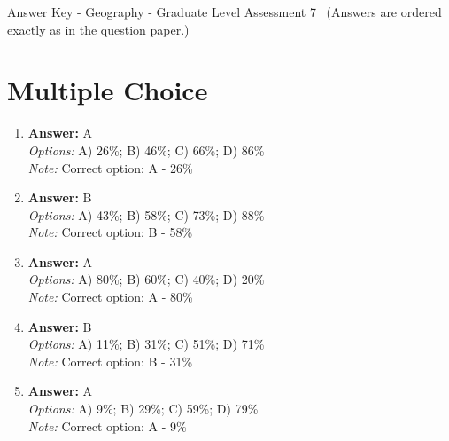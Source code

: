 \documentclass[12pt]{article}
\begin{document}
\begin{center}
Answer Key - Geography - Graduate Level Assessment 7 \
\small (Answers are ordered exactly as in the question paper.)
\end{center}

\section*{Multiple Choice}
\begin{enumerate}[label=\arabic*.]
\item \textbf{Answer:} A
\\ \textit{Options:} A) 26\%; B) 46\%; C) 66\%; D) 86\%
\\ \textit{Note:} Correct option: A - 26\%
\item \textbf{Answer:} B
\\ \textit{Options:} A) 43\%; B) 58\%; C) 73\%; D) 88\%
\\ \textit{Note:} Correct option: B - 58\%
\item \textbf{Answer:} A
\\ \textit{Options:} A) 80\%; B) 60\%; C) 40\%; D) 20\%
\\ \textit{Note:} Correct option: A - 80\%
\item \textbf{Answer:} B
\\ \textit{Options:} A) 11\%; B) 31\%; C) 51\%; D) 71\%
\\ \textit{Note:} Correct option: B - 31\%
\item \textbf{Answer:} A
\\ \textit{Options:} A) 9\%; B) 29\%; C) 59\%; D) 79\%
\\ \textit{Note:} Correct option: A - 9\%
\end{enumerate}
\end{document}
